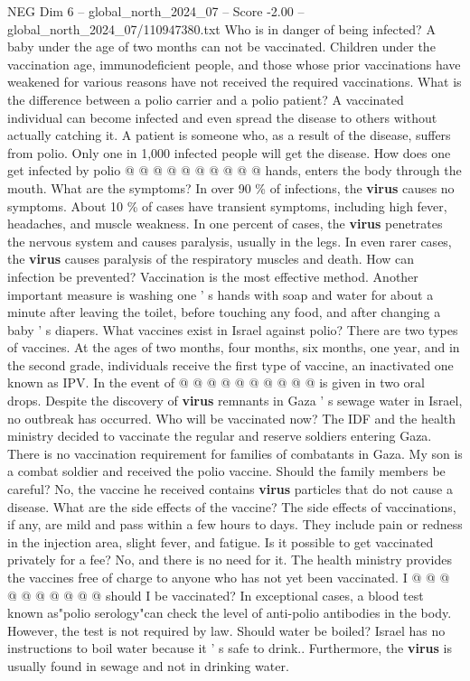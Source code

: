 \begin{textsample}{NEG Dim 6 – global\_north\_2024\_07 – Score -2.00 – global\_north\_2024\_07/110947380.txt}
Who is in danger of being infected?
A baby under the age of two months can not be vaccinated.
Children under the vaccination age, immunodeficient people, and those whose prior vaccinations have weakened for various reasons have not received the required vaccinations.
What is the difference between a polio carrier and a polio patient?
A vaccinated individual can become infected and even spread the disease to others without actually catching it.
A patient is someone who, as a result of the disease, suffers from polio.
Only one in 1,000 infected people will get the disease.
How does one get infected by polio @ @ @ @ @ @ @ @ @ @ hands, enters the body through the mouth.
What are the symptoms?
In over 90 \% of infections, the \textbf{virus} causes no symptoms.
About 10 \% of cases have transient symptoms, including high fever, headaches, and muscle weakness.
In one percent of cases, the \textbf{virus} penetrates the nervous system and causes paralysis, usually in the legs.
In even rarer cases, the \textbf{virus} causes paralysis of the respiratory muscles and death.
How can infection be prevented?
Vaccination is the most effective method.
Another important measure is washing one ' s hands with soap and water for about a minute after leaving the toilet, before touching any food, and after changing a baby ' s diapers.
What vaccines exist in Israel against polio?
There are two types of vaccines.
At the ages of two months, four months, six months, one year, and in the second grade, individuals receive the first type of vaccine, an inactivated one known as IPV.
In the event of @ @ @ @ @ @ @ @ @ @ is given in two oral drops.
Despite the discovery of \textbf{virus} remnants in Gaza ' s sewage water in Israel, no outbreak has occurred.
Who will be vaccinated now?
The IDF and the health ministry decided to vaccinate the regular and reserve soldiers entering Gaza.
There is no vaccination requirement for families of combatants in Gaza.
My son is a combat soldier and received the polio vaccine.
Should the family members be careful?
No, the vaccine he received contains \textbf{virus} particles that do not cause a disease.
What are the side effects of the vaccine?
The side effects of vaccinations, if any, are mild and pass within a few hours to days.
They include pain or redness in the injection area, slight fever, and fatigue.
Is it possible to get vaccinated privately for a fee?
No, and there is no need for it.
The health ministry provides the vaccines free of charge to anyone who has not yet been vaccinated.
I @ @ @ @ @ @ @ @ @ @ should I be vaccinated?
In exceptional cases, a blood test known as"polio serology"can check the level of anti-polio antibodies in the body.
However, the test is not required by law.
Should water be boiled?
Israel has no instructions to boil water because it ' s safe to drink..
Furthermore, the \textbf{virus} is usually found in sewage and not in drinking water.

\end{textsample}
